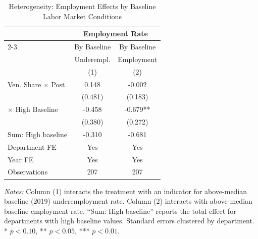 \begin{table}[htbp]
\centering
\caption{Heterogeneity: Employment Effects by Baseline Labor Market Conditions}
\label{tab:heterogeneity}
\begin{threeparttable}
\begin{tabular}{lcc}
\hline\hline
& \multicolumn{2}{c}{Employment Rate} \\
\cmidrule(lr){2-3}
& By Baseline & By Baseline \\
& Underempl. & Employment \\
& (1) & (2) \\
\hline
Ven. Share $\times$ Post & 0.148 & -0.002 \\
 & (0.481) & (0.183) \\
$\times$ High Baseline & -0.458 & -0.679** \\
 & (0.380) & (0.272) \\
\hline
Sum: High baseline & -0.310 & -0.681 \\
Department FE & Yes & Yes \\
Year FE & Yes & Yes \\
Observations & 207 & 207 \\
\hline\hline
\end{tabular}
\begin{tablenotes}[flushleft]
\small
\item \textit{Notes:} Column (1) interacts the treatment with an indicator for above-median baseline (2019) underemployment rate. Column (2) interacts with above-median baseline employment rate. ``Sum: High baseline'' reports the total effect for departments with high baseline values. Standard errors clustered by department. * $p<0.10$, ** $p<0.05$, *** $p<0.01$.
\end{tablenotes}
\end{threeparttable}
\end{table}

